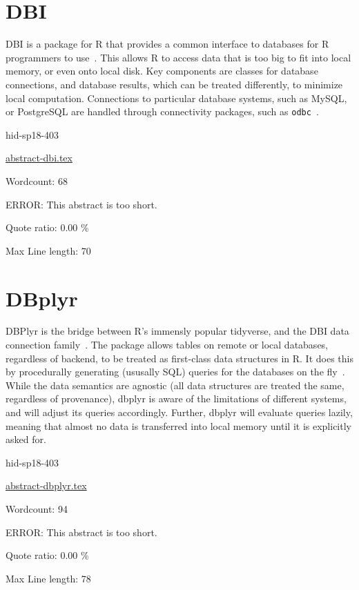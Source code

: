 \section{DBI}

DBI is a package for R that provides a common interface to databases
for R programmers to use~\cite{hid-sp18-403-R-dbi}. This allows
R to access data that is too big to fit into local memory, or even
onto local disk. Key components are classes for database connections,
and database results, which can be treated differently, to minimize
local computation. Connections to particular database systems, such as
MySQL, or PostgreSQL are handled through connectivity packages, such
as \texttt{odbc}~\cite{hid-sp18-403-rstudio-odbc}.


\begin{IU}

hid-sp18-403

\href{https://github.com/cloudmesh-community/hid-sp18-403/blob/master//technology/abstract-dbi.tex}{abstract-dbi.tex}

 

Wordcount: 68

ERROR: This abstract is too short.


Quote ratio: 0.00 \%
 
Max Line length: 70
\end{IU}

\section{DBplyr}

DBPlyr is the bridge between R’s immensly popular tidyverse, and the
DBI data connection family~\cite{hid-sp18-403-tidy-dbplyr}. The package allows
tables on remote or local databases, regardless of backend, to be
treated as first-class data structures in R. It does this by
procedurally generating (ususally SQL) queries for the databases on
the fly~\cite{hid-sp18-403-R-dbplyr}. While the data semantics are
agnostic (all data structures are treated the same, regardless of
provenance), dbplyr is aware of the limitations of different systems,
and will adjust its queries accordingly. Further, dbplyr will evaluate
queries lazily, meaning that almost no data is transferred into local
memory until it is explicitly asked for.


\begin{IU}

hid-sp18-403

\href{https://github.com/cloudmesh-community/hid-sp18-403/blob/master//technology/abstract-dbplyr.tex}{abstract-dbplyr.tex}

 

Wordcount: 94

ERROR: This abstract is too short.


Quote ratio: 0.00 \%
 
Max Line length: 78
\end{IU}

